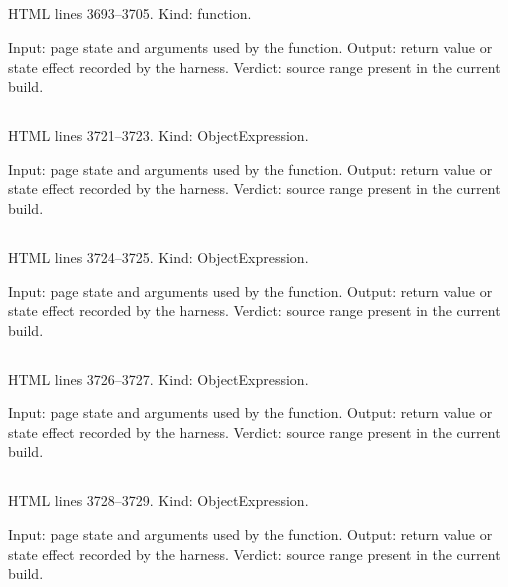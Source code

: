 \subsection*{\texttt{}}
\label{vf_125_qsExport}
HTML lines 3693--3705. Kind: function.

Input: page state and arguments used by the function.
Output: return value or state effect recorded by the harness.
Verdict: source range present in the current build.

\subsection*{\texttt{}}
\label{vf_126_QS_DYE_FILTER}
HTML lines 3721--3723. Kind: ObjectExpression.

Input: page state and arguments used by the function.
Output: return value or state effect recorded by the harness.
Verdict: source range present in the current build.

\subsection*{\texttt{}}
\label{vf_127_QS_TASK_ROLE}
HTML lines 3724--3725. Kind: ObjectExpression.

Input: page state and arguments used by the function.
Output: return value or state effect recorded by the harness.
Verdict: source range present in the current build.

\subsection*{\texttt{}}
\label{vf_128_QS_AMP}
HTML lines 3726--3727. Kind: ObjectExpression.

Input: page state and arguments used by the function.
Output: return value or state effect recorded by the harness.
Verdict: source range present in the current build.

\subsection*{\texttt{}}
\label{vf_129_QS_KIND}
HTML lines 3728--3729. Kind: ObjectExpression.

Input: page state and arguments used by the function.
Output: return value or state effect recorded by the harness.
Verdict: source range present in the current build.

